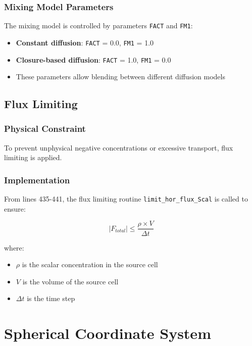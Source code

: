 \documentclass[11pt,a4paper]{article}
\begin{document}
\subsubsection{Mixing Model Parameters}

The mixing model is controlled by parameters \texttt{FACT} and \texttt{FM1}:
\begin{itemize}
\item \textbf{Constant diffusion}: \texttt{FACT} = 0.0, \texttt{FM1} = 1.0
\item \textbf{Closure-based diffusion}: \texttt{FACT} = 1.0, \texttt{FM1} = 0.0
\item These parameters allow blending between different diffusion models
\end{itemize}

\subsection{Flux Limiting}

\subsubsection{Physical Constraint}

To prevent unphysical negative concentrations or excessive transport, flux limiting is applied.

\subsubsection{Implementation}

From lines 435-441, the flux limiting routine \texttt{limit\_hor\_flux\_Scal} is called to ensure:

\begin{equation}
|F_{total}| \leq \frac{\rho \times V}{\Delta t}
\end{equation}

where:
\begin{itemize}
\item $\rho$ is the scalar concentration in the source cell
\item $V$ is the volume of the source cell
\item $\Delta t$ is the time step
\end{itemize}

\section{Spherical Coordinate System}
\end{document}
